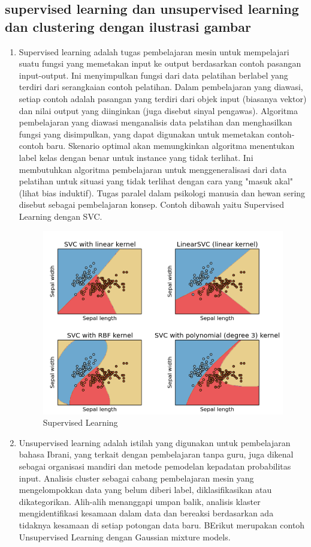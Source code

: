 \subsection{supervised learning dan unsupervised learning dan clustering dengan ilustrasi gambar}
\begin{enumerate}
\item Supervised learning adalah tugas pembelajaran mesin untuk mempelajari suatu fungsi yang memetakan input ke output berdasarkan contoh pasangan input-output. Ini menyimpulkan fungsi dari data pelatihan berlabel yang terdiri dari serangkaian contoh pelatihan. Dalam pembelajaran yang diawasi, setiap contoh adalah pasangan yang terdiri dari objek input (biasanya vektor) dan nilai output yang diinginkan (juga disebut sinyal pengawas). Algoritma pembelajaran yang diawasi menganalisis data pelatihan dan menghasilkan fungsi yang disimpulkan, yang dapat digunakan untuk memetakan contoh-contoh baru. Skenario optimal akan memungkinkan algoritma menentukan label kelas dengan benar untuk instance yang tidak terlihat. Ini membutuhkan algoritma pembelajaran untuk menggeneralisasi dari data pelatihan untuk situasi yang tidak terlihat dengan cara yang "masuk akal" (lihat bias induktif). Tugas paralel dalam psikologi manusia dan hewan sering disebut sebagai pembelajaran konsep. Contoh dibawah yaitu Supervised Learning dengan SVC.
\begin{figure}[ht]
\centering
\includegraphics[scale=0.5]{figures/wiendh2.png}
\caption{Supervised Learning}
\label{contoh}
\end{figure}
\item Unsupervised learning adalah istilah yang digunakan untuk pembelajaran bahasa Ibrani, yang terkait dengan pembelajaran tanpa guru, juga dikenal sebagai organisasi mandiri dan metode pemodelan kepadatan probabilitas input. Analisis cluster sebagai cabang pembelajaran mesin yang mengelompokkan data yang belum diberi label, diklasifikasikan atau dikategorikan. Alih-alih menanggapi umpan balik, analisis klaster mengidentifikasi kesamaan dalam data dan bereaksi berdasarkan ada tidaknya kesamaan di setiap potongan data baru. BErikut merupakan contoh Unsupervised Learning dengan Gaussian mixture models.

\end{enumerate}
